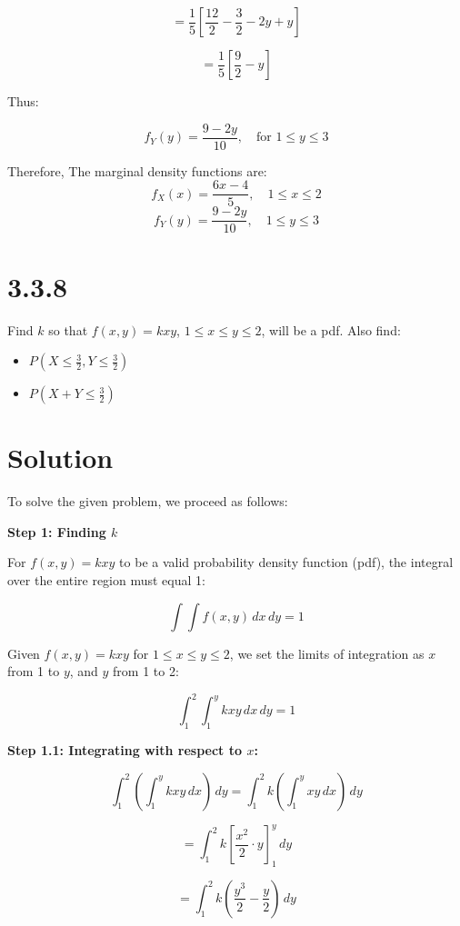 \documentclass{article}
\begin{document}
\[
= \frac{1}{5} \left[ \frac{12}{2} - \frac{3}{2} - 2y + y \right]
\]

\[
= \frac{1}{5} \left[ \frac{9}{2} - y \right]
\]

Thus:

\[
f_Y(y) = \frac{9 - 2y}{10}, \quad \text{for } 1 \leq y \leq 3
\]


\large Therefore, The marginal density functions are:
\[
f_X(x) = \frac{6x - 4}{5}, \quad 1 \leq x \leq 2
\]
\[
f_Y(y) = \frac{9 - 2y}{10}, \quad 1 \leq y \leq 3
\]


\section*{3.3.8}

Find \(k\) so that \(f(x, y) = kxy\), \(1 \leq x \leq y \leq 2\), will be a pdf. Also find:

\begin{itemize}
    \item[(i)] \(P\left( X \leq \frac{3}{2}, Y \leq \frac{3}{2} \right)\)
    \item[(ii)] \(P\left( X + Y \leq \frac{3}{2} \right)\)
\end{itemize}


\section*{Solution}

To solve the given problem, we proceed as follows:

\textbf{Step 1: Finding \(k\)}

For \(f(x, y) = kxy\) to be a valid probability density function (pdf), the integral over the entire region must equal 1:

\[
\int \int f(x, y) \, dx \, dy = 1
\]

Given \(f(x, y) = kxy\) for \(1 \leq x \leq y \leq 2\), we set the limits of integration as \(x\) from 1 to \(y\), and \(y\) from 1 to 2:

\[
\int_{1}^{2} \int_{1}^{y} kxy \, dx \, dy = 1
\]

\textbf{Step 1.1: Integrating with respect to \(x\):}

\[
\int_{1}^{2} \left( \int_{1}^{y} kxy \, dx \right) \, dy = \int_{1}^{2} k \left( \int_{1}^{y} xy \, dx \right) \, dy
\]

\[
= \int_{1}^{2} k \left[ \frac{x^2}{2} \cdot y \right]_{1}^{y} \, dy
\]

\[
= \int_{1}^{2} k \left( \frac{y^3}{2} - \frac{y}{2} \right) \, dy
\]
\end{document}

